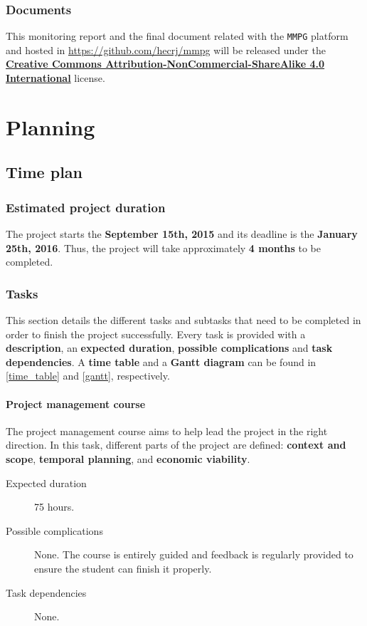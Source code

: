 \documentclass[a4paper,11pt,titlepage,abstract,numbers=noenddot,automark,mnsy,intlimits,rgb,dvipsnames]{report}
\begin{document}
\section{Documents}
This monitoring report and the final document related with the \texttt{MMPG} platform and hosted in
\url{https://github.com/hecrj/mmpg} will be released under the
\href{http://creativecommons.org/licenses/by-nc-sa/4.0/legalcode.txt}{\textbf{Creative Commons Attribution-NonCommercial-ShareAlike 4.0 International}}
license.
\clearpage
\part{Planning}
\chapter{Time plan}
\section{Estimated project duration}
The project starts the \textbf{September 15th, 2015} and its deadline is the \textbf{January 25th, 2016}. Thus,
the project will take approximately \textbf{4 months} to be completed.
\section{Tasks}
This section details the different tasks and subtasks that need to be completed in order
to finish the project successfully. Every task is provided with a \textbf{description}, an \textbf{expected duration},
\textbf{possible complications} and \textbf{task dependencies}. A \textbf{time table} and a \textbf{Gantt diagram}
can be found in \autoref{time_table} and \autoref{gantt}, respectively.
\subsection{Project management course}
The project management course aims to help lead the project in the right direction. In this task,
different parts of the project are defined: \textbf{context and scope}, \textbf{temporal planning}, and
\textbf{economic viability}.
\begin{description}
\item[Expected duration]
75 hours.
\item[Possible complications]
None. The course is entirely guided and feedback is
  regularly provided to ensure the student can finish it properly.
\item[Task dependencies]
None.
\end{description}
\end{document}
